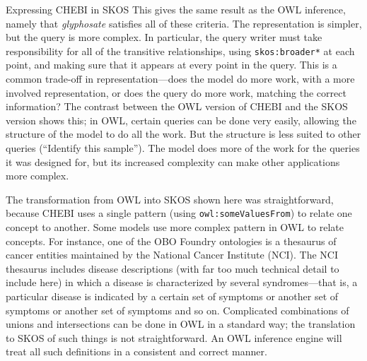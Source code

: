 \begin{challenge}{Expressing CHEBI in SKOS}
This gives the same result as the OWL inference, namely that \textit{glyphosate}
satisfies all of these criteria. The representation is simpler, but the
query is more complex. In particular, the query writer must take
responsibility for all of the transitive relationships, using
\texttt{skos:broader*} at each point, and making sure that it appears at every
point in the query. This is a common trade-off in representation---does
the model do more work, with a more involved representation, or does the
query do more work, matching the correct information? The contrast
between the OWL version of CHEBI and the SKOS version shows this; in
OWL, certain queries can be done very easily, allowing the structure of
the model to do all the work. But the structure is less suited to other
queries (``Identify this sample''). The model does more of the work for
the queries it was designed for, but its increased complexity can make
other applications more complex.

The transformation from OWL into SKOS shown here was straightforward,
because CHEBI uses a single pattern (using \texttt{owl:someValuesFrom}) to relate
one concept to another. Some models use more complex pattern in OWL to
relate concepts. For instance, one of the OBO Foundry ontologies is a
thesaurus of cancer entities maintained by the National Cancer Institute
(NCI). The NCI thesaurus includes disease descriptions (with far too
much technical detail to include here) in which a disease is
characterized by several syndromes---that is, a particular disease is
indicated by a certain set of symptoms or another set of symptoms or
another set of symptoms and so on. Complicated combinations of unions
and intersections can be done in OWL in a standard way; the translation
to SKOS of such things is not straightforward. An OWL inference engine
will treat all such definitions in a consistent and correct manner.




\end{challenge}

